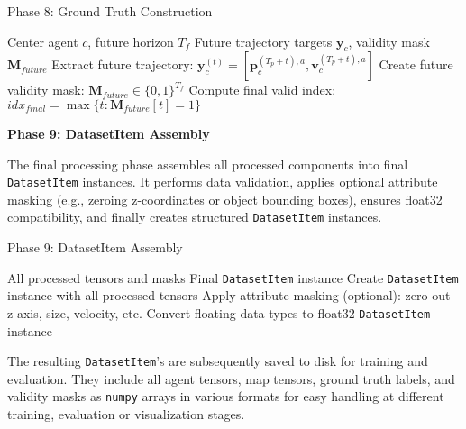 \begin{algorithm}[H]
\caption{Phase 8: Ground Truth Construction}
\label{alg:phase8_ground_truth}
\begin{algorithmic}[1]
\REQUIRE Center agent $c$, future horizon $T_f$
\ENSURE Future trajectory targets $\boldsymbol{y}_c$, validity mask $\boldsymbol{M}_{future}$
    \STATE Extract future trajectory: $\boldsymbol{y}_c^{(t)} = [\boldsymbol{p}_c^{(T_p+t),a}, \boldsymbol{v}_c^{(T_p+t),a}]$
\ENDFOR
\STATE Create future validity mask: $\boldsymbol{M}_{future} \in \{0,1\}^{T_f}$
\STATE Compute final valid index: $idx_{final} = \max\{t : \boldsymbol{M}_{future}[t] = 1\}$
\end{algorithmic}
\end{algorithm}

\textbf{Phase 9: DatasetItem Assembly}

The final processing phase assembles all processed components into final \texttt{DatasetItem} instances. It performs data validation, applies optional attribute masking (e.g., zeroing z-coordinates or object bounding boxes), ensures float32 compatibility, and finally creates structured \texttt{DatasetItem} instances.
\begin{algorithm}[H]
\caption{Phase 9: DatasetItem Assembly}
\label{alg:phase9_assembly}
\begin{algorithmic}[1]
\REQUIRE All processed tensors and masks
\ENSURE Final \texttt{DatasetItem} instance
\STATE Create \texttt{DatasetItem} instance with all processed tensors
\STATE Apply attribute masking (optional): zero out z-axis, size, velocity, etc.
\STATE Convert floating data types to float32
\RETURN \texttt{DatasetItem} instance
\end{algorithmic}
\end{algorithm}

The resulting \texttt{DatasetItem}'s are subsequently saved to disk for training and evaluation. They include all agent tensors, map tensors, ground truth labels, and validity masks as \texttt{numpy} arrays in various formats for easy handling at different training, evaluation or visualization stages.